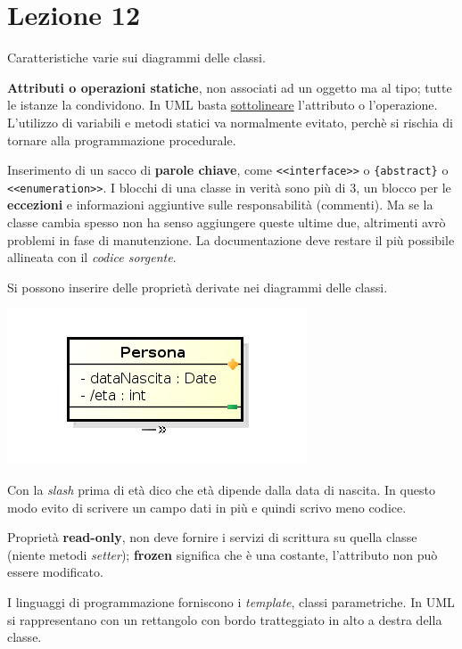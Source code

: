 \section{Lezione 12}

Caratteristiche varie sui diagrammi delle classi.

\textbf{Attributi o operazioni statiche}, non associati ad un oggetto ma al tipo; tutte le istanze la condividono. In UML basta \underline{sottolineare} l'attributo o l'operazione. L'utilizzo di variabili e metodi statici va normalmente evitato, perchè si rischia di tornare alla programmazione procedurale.

Inserimento di un sacco di \textbf{parole chiave}, come \texttt{<<interface>>} o \texttt{\{abstract\}} o \texttt{<<enumeration>>}. I blocchi di una classe in verità sono più di 3, un blocco per le \textbf{eccezioni} e informazioni aggiuntive sulle responsabilità (commenti). Ma se la classe cambia spesso non ha senso aggiungere queste ultime due, altrimenti avrò problemi in fase di manutenzione. La documentazione deve restare il più possibile allineata con il \textit{codice sorgente}.

Si possono inserire delle proprietà derivate nei diagrammi delle classi.

\begin{center}

\includegraphics[width=0.75\columnwidth]{img1} %

\end{center}

Con la \textit{slash} prima di età dico che età dipende dalla data di nascita. In questo modo evito di scrivere un campo dati in più e quindi scrivo meno codice.

Proprietà \textbf{read-only}, non deve fornire i servizi di scrittura su quella classe (niente metodi \textit{setter}); \textbf{frozen} significa che è una costante, l'attributo non può essere modificato.

I linguaggi di programmazione forniscono i \textit{template}, classi parametriche. In UML si rappresentano con un rettangolo con bordo tratteggiato in alto a destra della classe. 

